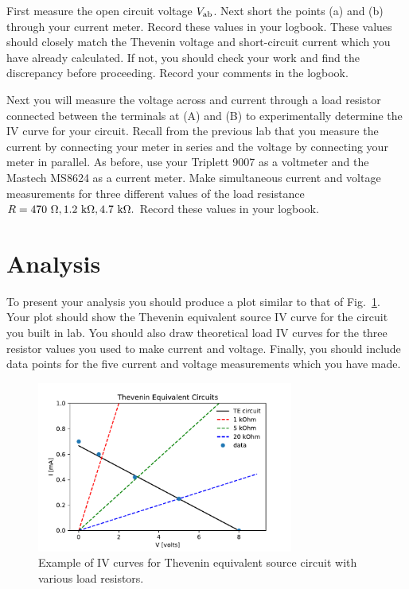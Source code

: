 \begin{measurement} 
First measure the open circuit voltage $V_{\rm ab}$.  Next short the
points (a) and (b) through your current meter. Record these values in
your logbook.  These values should closely match the Thevenin voltage
and short-circuit current which you have already calculated.  If not,
you should check your work and find the discrepancy before
proceeding. Record your comments in the logbook.
\end{measurement}

\begin{measurement}  
Next you will measure the voltage across and current through a load
resistor connected between the terminals at (A) and (B) to
experimentally determine the IV curve for your circuit.  Recall from
the previous lab that you measure the current by connecting your meter
in series and the voltage by connecting your meter in parallel.  As
before, use your Triplett 9007 as a voltmeter and the Mastech MS8624
as a current meter. Make simultaneous current and voltage measurements
for three different values of the load resistance $R = 470~{\rm
  \Omega}, 1.2~\rm k\Omega, 4.7~\rm k\Omega.$ Record these values in
your logbook.
\end{measurement}

\section{Analysis}

\begin{plot}
To present your analysis you should produce a plot similar to that of
Fig.~\ref{fig:egthev}.  Your plot should show the Thevenin equivalent
source IV curve for the circuit you built in lab.  You should also
draw theoretical load IV curves for the three resistor values you used
to make current and voltage.  Finally, you should include data points
for the five current and voltage measurements which you have made.
\end{plot}

\begin{figure}[htbp]
\begin{center}
\includegraphics[width=0.75\textwidth]{figs/labs/thevenin/final.pdf} 
\caption{Example of IV curves for Thevenin equivalent source circuit with various load resistors. }
\label{fig:egthev}
\end{center}
\end{figure}

